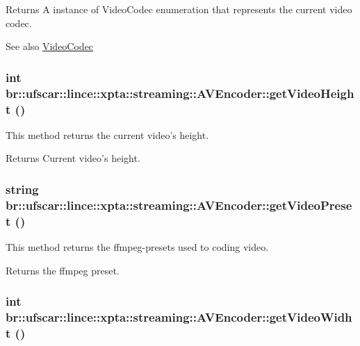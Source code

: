 \begin{DoxyReturn}{Returns}
A instance of VideoCodec enumeration that represents the current video codec. 
\end{DoxyReturn}
\begin{DoxySeeAlso}{See also}
\hyperlink{namespacebr_1_1ufscar_1_1lince_1_1xpta_1_1streaming_a0bc6a141499db1ee70a729b694d2dace}{VideoCodec} 
\end{DoxySeeAlso}
\hypertarget{classbr_1_1ufscar_1_1lince_1_1xpta_1_1streaming_1_1AVEncoder_ac80a2f59155f08f21285082270b89946}{
\subsubsection[{getVideoHeight}]{\setlength{\rightskip}{0pt plus 5cm}int br::ufscar::lince::xpta::streaming::AVEncoder::getVideoHeight ()}}
\label{classbr_1_1ufscar_1_1lince_1_1xpta_1_1streaming_1_1AVEncoder_ac80a2f59155f08f21285082270b89946}


This method returns the current video's height. 

\begin{DoxyReturn}{Returns}
Current video's height. 
\end{DoxyReturn}
\hypertarget{classbr_1_1ufscar_1_1lince_1_1xpta_1_1streaming_1_1AVEncoder_aeb8d6031685e79ce0e8bc4a4b9e6e8fb}{
\subsubsection[{getVideoPreset}]{\setlength{\rightskip}{0pt plus 5cm}string br::ufscar::lince::xpta::streaming::AVEncoder::getVideoPreset ()}}
\label{classbr_1_1ufscar_1_1lince_1_1xpta_1_1streaming_1_1AVEncoder_aeb8d6031685e79ce0e8bc4a4b9e6e8fb}


This method returns the ffmpeg-\/presets used to coding video. 

\begin{DoxyReturn}{Returns}
the ffmpeg preset. 
\end{DoxyReturn}
\hypertarget{classbr_1_1ufscar_1_1lince_1_1xpta_1_1streaming_1_1AVEncoder_a711dede4f5b7351280a753310e199088}{
\subsubsection[{getVideoWidht}]{\setlength{\rightskip}{0pt plus 5cm}int br::ufscar::lince::xpta::streaming::AVEncoder::getVideoWidht ()}}
\label{classbr_1_1ufscar_1_1lince_1_1xpta_1_1streaming_1_1AVEncoder_a711dede4f5b7351280a753310e199088}


